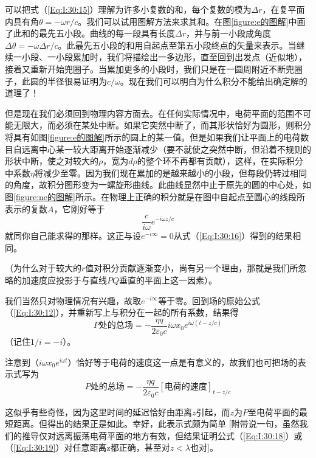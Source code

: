 可以把式（\ref{Eq:I:30:15}）理解为许多小复数的和，每个复数的模为$\Delta r$，在复平面内具有角$\theta=-\omega r/c$。我们可以试用图解方法来求其和。在图\ref{figure:e的图解}中画了此和的最先五小段。曲线的每一段具有长度$\Delta r$，并与前一小段成角度$\Delta\theta=-\omega\Delta r/c$。此最先五小段的和用自起点至第五小段终点的矢量来表示。当继续一小段、一小段累加时，我们将描绘出一多边形，直至回到出发点（近似地），接着又重新开始兜圈子。当累加更多的小段时，我们只是在一圆周附近不断兜圈子，此圆的半径很易证明为$c/\omega$。现在我们可以明白为什么积分不能给出确定解的道理了！

但是现在我们必须回到物理内容方面去。在任何实际情况中，电荷平面的范围不可能无限大，而必须在某处中断。如果它突然中断了，而其形状恰好为圆形，则积分将具有如图\ref{figure:e的图解}所示的圆上的某一值。但是如果我们让平面上的电荷数目自远离中心某一较大距离开始逐渐减少（要不就使之突然中断，但沿着不规则的形状中断，使之对较大的$\rho$，宽为$d\rho$的整个环不再都有贡献），这样，在实际积分中系数$\eta$将减少至零。因为我们现在累加的是越来越小的小段，但每段仍转过相同的角度，故积分图形变为一螺旋形曲线。此曲线显然中止于原先的圆的中心处，如图\ref{figure:ne的图解}所示。在物理上正确的积分就是在图中自起点至圆心的线段所表示的复数$A$，它刚好等于
\begin{equation}
    \label{Eq:I:30:17}
    \frac{c}{i\omega}e^{-i\omega z/c}
\end{equation}
就同你自己能求得的那样。这正与设$e^{-i\infty}=0$从式（\ref{Eq:I:30:16}）得到的结果相同。

（为什么对于较大的$r$值对积分贡献逐渐变小，尚有另一个理由，那就是我们所忽略的加速度应投影于与直线$PQ$垂直的平面上这一因素）。

我们当然只对物理情况有兴趣，故取$e^{-i\infty}$等于零。回到场的原始公式（\ref{Eq:I:30:12}），并重新写上与积分在一起的所有系数，结果得
\begin{equation}
    \label{Eq:I:30:18}
    \text{$P$处的总场}=-\frac{\eta q}{2\varepsilon_0c}i\omega x_0e^{i\omega(t-z/c)}
\end{equation}
（记住$1/i=-i$）。

注意到（$i\omega x_0e^{i\omega t}$）恰好等于电荷的速度这一点是有意义的，故我们也可把场的表示式写为
\begin{equation}
    \label{Eq:I:30:19}
    \text{$P$处的总场}=-\frac{\eta q}{2\varepsilon_0c}[\text{电荷的速度}]_{t-z/c}
\end{equation}

这似乎有些奇怪，因为这里时间的延迟恰好由距离$z$引起，而$z$为$P$至电荷平面的最短距离。但得出的结果正是如此。幸好，此表示式颇为简单 [附带说一句，虽然我们的推导仅对远离振荡电荷平面的地方有效，但结果证明公式（\ref{Eq:I:30:18}）或（\ref{Eq:I:30:19}）对任意距离z都正确，甚至对$z<\lambda$也对]。